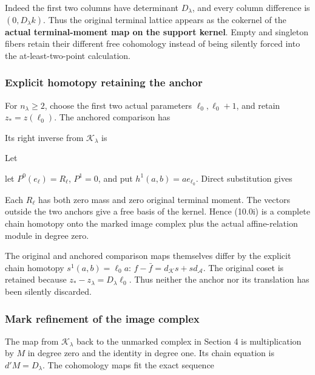 Indeed the first two columns have determinant \(D_\lambda\), and every
column difference is \((0,D_\lambda k)\). Thus the original terminal
lattice appears as the cokernel of the \textbf{actual terminal-moment
map on the support kernel}. Empty and singleton fibers retain their
different free cohomology instead of being silently forced into the
at-least-two-point calculation.

\subsubsection{Explicit homotopy retaining the anchor}

For \(n_\lambda\ge2\), choose the first two actual parameters
\(\ell_0,\ell_0+1\), and retain \(z_*=z(\ell_0)\). The anchored
comparison has


Its right inverse from \(\mathcal K_\lambda\) is


Let


let \(P^0(e_\ell)=R_\ell\), \(P^1=0\), and put
\(h^1(a,b)=a e_{\ell_0}\). Direct substitution gives


Each \(R_\ell\) has both zero mass and zero original terminal moment.
The vectors outside the two anchors give a free basis of the kernel.
Hence (10.0i) is a complete chain homotopy onto the marked image complex
plus the actual affine-relation module in degree zero.

The original and anchored comparison maps themselves differ by the
explicit chain homotopy \(s^1(a,b)=\ell_0 a\):
\(f-\bar f=d_{\mathcal K}s+s d_{\mathcal A}\). The original coset is
retained because \(z_*-z_\lambda=D_\lambda\ell_0\). Thus neither the
anchor nor its translation has been silently discarded.

\subsubsection{Mark refinement of the image complex}

The map from \(\mathcal K_\lambda\) back to the unmarked complex in
Section 4 is multiplication by \(M\) in degree zero and the identity in
degree one. Its chain equation is \(d'M=D_\lambda\). The cohomology maps
fit the exact sequence

